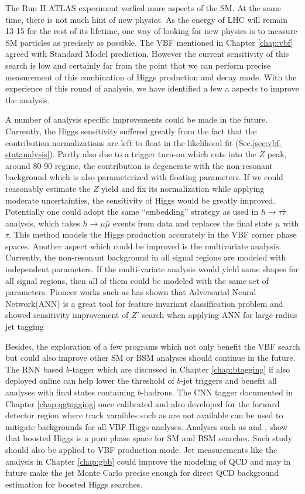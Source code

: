 The Run II ATLAS experiment verfied more aspects of the SM. At the same time, there is not much hint of new physics. As the energy of LHC will remain 13-15 \tev for the rest of its lifetime, one way of looking for new physics is to measure SM particles as precisely as possible. The VBF \Hbb mentioned in Chapter \ref{chap:vbf} agreed with Standard Model prediction. However the current sensitivity of this search is low and certainly far from the point that we can perform precise measurement of this combination of Higgs production and decay mode. With the experience of this round of analysis, we have identified a few a aspects to improve the analysis.

A number of analysis specific improvements could be made in the future. Currently, the Higgs sensitivity suffered greatly from the fact that the \zbb contribution normalizations are left to float in the likelihood fit (Sec.\ref{sec:vbf-statanalysis}). Partly also due to a trigger turn-on which cuts into the $Z$ peak, around 80-90 \gev regime, the \zbb contribution is degenerate with the non-resonant background which is also parameterized with floating parameters. If we could reasonably estimate the $Z$ yield and fix its normalization while applying moderate uncertainties, the sensitivity of Higgs would be greatly improved. Potentially one could adopt the same ``embedding'' strategy as used in $h\rightarrow \tau \bar{\tau}$ analysis\cite{HIGG-2013-32}, which takes $h\rightarrow \mu \bar{\mu}$ events from data and replaces the final state $\mu$ with $\tau$. This method models the Higgs production accurately in the VBF corner phase spaces. Another aspect which could be improved is the multivariate analysis. Currently, the non-resonant background in all signal regions are modeled with independent parameters. If the  multi-variate analysis would yield same shapes for all signal regions, then all of them could be modeled with the same set of parameters. Pioneer works such as \cite{ann} has shown that Adversarial Neural Network(ANN) is a great tool for feature invariant classification problem and showed sensitivity improvement of $Z'$ search when applying ANN for large radius jet tagging

Besides, the exploration of a few programs which not only benefit the VBF \Hbb search but could also improve other SM or BSM analyses should continue in the future. The RNN based $b$-tagger which are discussed in Chapter \ref{chap:btagging} if also deployed online can help lower the threshold of $b$-jet triggers and benefit all analyses with final states containing $b$-hadrons. The CNN tagger documented in Chapter \ref{chap:qgtagging} once calibrated and also developed for the forward detector region where track varaibles such as \ntrk are not available can be used to mitigate backgrounds for all VBF Higgs analyses. Analyses such as \cite{Aaboud:2017ecz} and \cite{2h4b}, show that boosted Higgs is a pure phase space for SM and BSM searches. Such study should also be applied to VBF production mode. Jet measurements like the \gbb analysis in Chapter \ref{chap:gbb} could improve the modeling of QCD and may in future make the jet Monte Carlo precise enough for direct QCD background estimation for boosted Higgs searches. 
